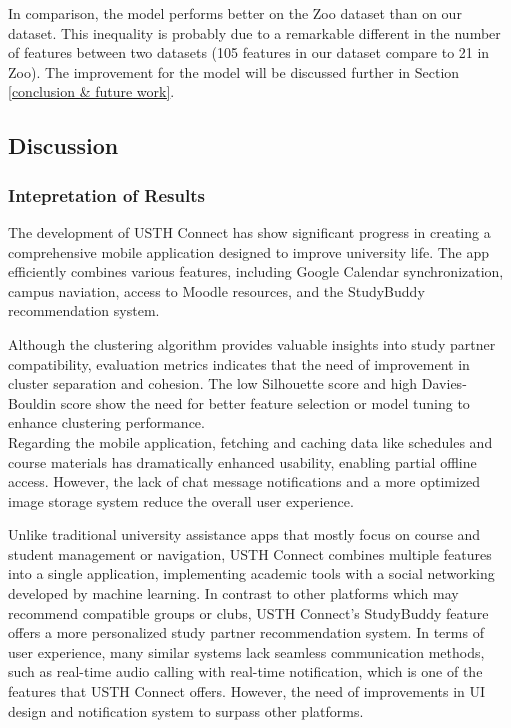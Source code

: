 \documentclass[12pt]{article}
\makeatletter
\newcommand\subsubsubsection{\@startsection{paragraph}{4}{\z@}{-2.5ex\@plus -1ex \@minus -.25ex}{1.25ex \@plus .25ex}{\normalfont\normalsize\bfseries}}
\makeatother
\begin{document}
In comparison, the model performs better on the Zoo dataset than on our dataset. This inequality is probably due to a remarkable different in the number of features between two datasets (105 features in our dataset compare to 21 in Zoo). The improvement for the model will be discussed further in Section \ref{conclusion & future work}.

\subsection{Discussion}
\subsubsection{Intepretation of Results}
The development of USTH Connect has show significant progress in creating a comprehensive mobile application designed to improve university life.
The app efficiently combines various features, including Google Calendar synchronization, campus naviation, access to Moodle resources, and the StudyBuddy recommendation system.

Although the clustering algorithm provides valuable insights into study partner compatibility, evaluation metrics indicates that the need of improvement in cluster separation and cohesion.
The low Silhouette score and high Davies-Bouldin score show the need for better feature selection or model tuning to enhance clustering performance. \\

Regarding the mobile application, fetching and caching data like schedules and course materials has dramatically enhanced usability, enabling partial offline access.
However, the lack of chat message notifications and a more optimized image storage system reduce the overall user experience.

\pagebreak

\subsubsubsection{Comparison to Similar System}
Unlike traditional university assistance apps that mostly focus on course and student management or navigation, USTH Connect combines multiple features into a single application, implementing academic tools with a social networking developed by machine learning.
In contrast to other platforms which may recommend compatible groups or clubs, USTH Connect's StudyBuddy feature offers a more personalized study partner recommendation system.
In terms of user experience, many similar systems lack seamless communication methods, such as real-time audio calling with real-time notification, which is one of the features that USTH Connect offers.
However, the need of improvements in UI design and notification system to surpass other platforms.
\end{document}
